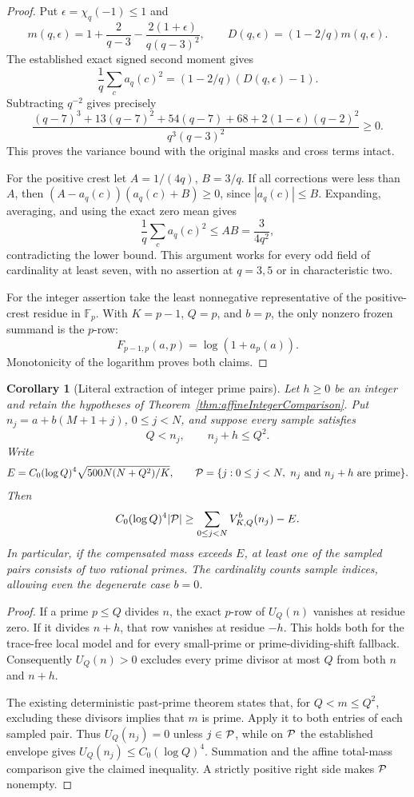 \documentclass[11pt]{article}
\newtheorem{corollary}[theorem]{Corollary}
\begin{document}
\begin{proof}
Put \(\epsilon=\chi_q(-1)\leq1\) and
\[
 m(q,\epsilon)=1+\frac2{q-3}
                   -\frac{2(1+\epsilon)}{q(q-3)^2},
 \qquad D(q,\epsilon)=(1-2/q)m(q,\epsilon).
\]
The established exact signed second moment gives
\[
 \frac1q\sum_c a_q(c)^2
                  =(1-2/q)(D(q,\epsilon)-1).
\]
Subtracting \(q^{-2}\) gives precisely
\[
 \frac{(q-7)^3+13(q-7)^2+54(q-7)+68
                    +2(1-\epsilon)(q-2)^2}
                    {q^3(q-3)^2}\geq0.
\]
This proves the variance bound with the original masks and cross
terms intact.

For the positive crest let \(A=1/(4q)\), \(B=3/q\).
If all corrections were less than \(A\), then
\((A-a_q(c))(a_q(c)+B)\geq0\), since \(|a_q(c)|\leq B\).
Expanding, averaging, and using the exact zero mean gives
\[
 \frac1q\sum_c a_q(c)^2\leq AB=\frac3{4q^2},
\]
contradicting the lower bound. This argument works for every odd
field of cardinality at least seven, with no assertion at \(q=3,5\)
or in characteristic two.

For the integer assertion take the least nonnegative representative
of the positive-crest residue in \(\mathbb F_p\). With \(K=p-1\),
\(Q=p\), and \(b=p\), the only nonzero frozen summand is the \(p\)-row:
\[
                 F_{p-1,p}(a,p)=\log(1+a_p(a)).
\]
Monotonicity of the logarithm proves both claims.
\end{proof}

\begin{corollary}[Literal extraction of integer prime pairs]
\label{cor:literalIntegerPairExtraction}
Let \(h\geq0\) be an integer and retain the hypotheses of
Theorem~\ref{thm:affineIntegerComparison}. Put \(n_j=a+b(M+1+j)\),
\(0\leq j<N\), and suppose every sample satisfies
\[
                            Q<n_j,\qquad n_j+h\leq Q^2.
\]
Write
\[
 E=C_0(\log Q)^4\sqrt{500N(N+Q^2)/K},\qquad
 {\cal P}=\{j:0\leq j<N,\ n_j\ \hbox{and}\ n_j+h\ \hbox{are prime}\}.
\]
Then
\[
 C_0(\log Q)^4|{\cal P}|
              \geq \sum_{0\leq j<N}V^b_{K,Q}(n_j)-E.
\]
In particular, if the compensated mass exceeds \(E\), at least one
of the sampled pairs consists of two rational primes.
The cardinality counts sample indices, allowing even the degenerate
case \(b=0\).
\end{corollary}

\begin{proof}
If a prime \(p\leq Q\) divides \(n\), the exact \(p\)-row of \(U_Q(n)\)
vanishes at residue zero. If it divides \(n+h\), that row vanishes at
residue \(-h\). This holds both for the trace-free local model and for
every small-prime or prime-dividing-shift fallback.
Consequently \(U_Q(n)>0\) excludes every prime divisor at most \(Q\)
from both \(n\) and \(n+h\).

The existing deterministic past-prime theorem states that, for
\(Q<m\leq Q^2\), excluding these divisors implies that \(m\) is prime.
Apply it to both entries of each sampled pair.
Thus \(U_Q(n_j)=0\) unless \(j\in{\cal P}\), while on \({\cal P}\)
the established envelope gives \(U_Q(n_j)\leq C_0(\log Q)^4\).
Summation and the affine total-mass comparison give the claimed
inequality. A strictly positive right side makes \({\cal P}\)
nonempty.
\end{proof}
\end{document}
